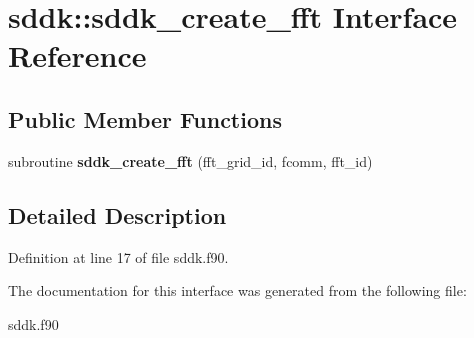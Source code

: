 \hypertarget{interfacesddk_1_1sddk__create__fft}{}\section{sddk\+:\+:sddk\+\_\+create\+\_\+fft Interface Reference}
\label{interfacesddk_1_1sddk__create__fft}
\subsection*{Public Member Functions}
\begin{DoxyCompactItemize}
\item 
\hypertarget{interfacesddk_1_1sddk__create__fft_a5c91428d9438461ad8da56e32c077abc}{}subroutine {\bfseries sddk\+\_\+create\+\_\+fft} (fft\+\_\+grid\+\_\+id, fcomm, fft\+\_\+id)\label{interfacesddk_1_1sddk__create__fft_a5c91428d9438461ad8da56e32c077abc}

\end{DoxyCompactItemize}


\subsection{Detailed Description}


Definition at line 17 of file sddk.\+f90.



The documentation for this interface was generated from the following file\+:\begin{DoxyCompactItemize}
\item 
sddk.\+f90\end{DoxyCompactItemize}
